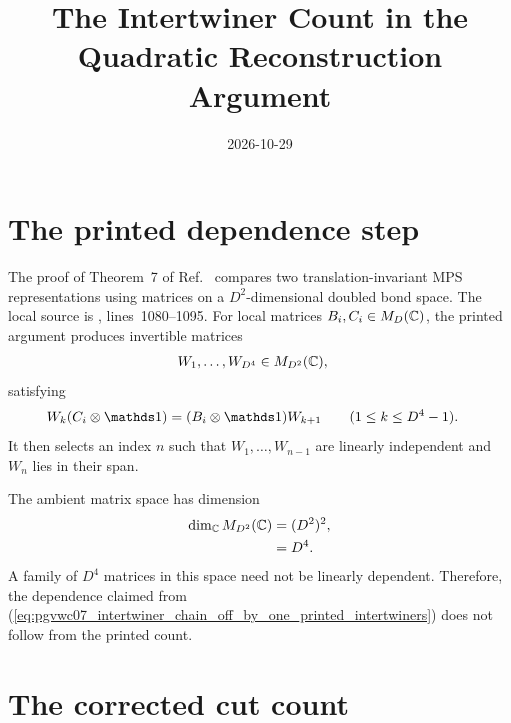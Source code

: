 \documentclass{article}
\title{The Intertwiner Count in the Quadratic Reconstruction Argument}
\author{}
\date{2026-10-29}
\begin{document}
\maketitle
{}

\section{The printed dependence step}

The proof of Theorem~7 of
Ref.~\cite{PerezGarcia2007Matrix} compares two translation-invariant MPS
representations using matrices on a $D^2$-dimensional doubled bond space. The
local source is
, lines~1080--1095. For local
matrices $B_i,C_i\in M_D(\mathbb{C})$, the printed argument produces invertible
matrices
\begin{align}
    W_1,\ldots,W_{D^4}
     & \in M_{D^2}(\mathbb{C}),
    \label{eq:pgvwc07_intertwiner_chain_off_by_one_printed_intertwiners}
\end{align}
satisfying
\begin{align}
    W_k(C_i\otimes\Id)
     & = (B_i\otimes\Id)W_{k+1}
    \qquad(1\leq k\leq D^4-1).
    \label{eq:pgvwc07_intertwiner_chain_off_by_one_printed_chain}
\end{align}
It then selects an index $n$ such that $W_1,\ldots,W_{n-1}$ are linearly
independent and $W_n$ lies in their span.

The ambient matrix space has dimension
\begin{align}
    \dim_{\mathbb{C}}M_{D^2}(\mathbb{C})
     & = (D^2)^2,
    \label{eq:pgvwc07_intertwiner_chain_off_by_one_ambient_dimension_square} \\
     & = D^4.
    \label{eq:pgvwc07_intertwiner_chain_off_by_one_ambient_dimension}
\end{align}
A family of $D^4$ matrices in this space need not be linearly dependent.
Therefore, the dependence claimed from
(\ref{eq:pgvwc07_intertwiner_chain_off_by_one_printed_intertwiners}) does not
follow from the printed count.

\section{The corrected cut count}
\end{document}

